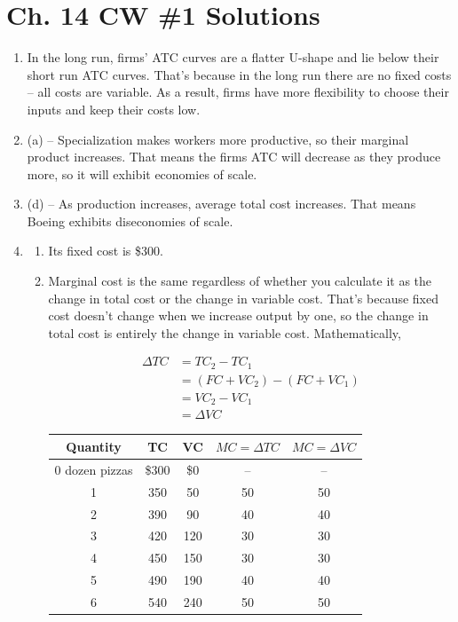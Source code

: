 \documentclass{article}
\begin{document}
\section*{Ch. 14 CW \#1 Solutions}

\begin{enumerate}

\item In the long run, firms' ATC curves are a flatter U-shape and lie below their short run ATC curves. That's because in the long run there are no fixed costs -- all costs are variable. As a result, firms have more flexibility to choose their inputs and keep their costs low.

\item (a) -- Specialization makes workers more productive, so their marginal product increases. That means the firms ATC will decrease as they produce more, so it will exhibit economies of scale.

\item (d) -- As production increases, average total cost increases. That means Boeing exhibits diseconomies of scale. 

\item

	\begin{enumerate}
	
	\item Its fixed cost is \$300.
	
	\item Marginal cost is the same regardless of whether you calculate it as the change in total cost or the change in variable cost. That's because fixed cost doesn't change when we increase output by one, so the change in total cost is entirely the change in variable cost. Mathematically,
	
	\begin{align*}
	\Delta TC &= TC_2 - TC_1 \\
	&= (FC + VC_2) - (FC + VC_1) \\
	&= VC_2 - VC_1 \\
	&= \Delta VC
	\end{align*}
	
	\begin{center}
	\begin{tabular}{c | c | c | c | c}
	Quantity & TC & VC & $MC = \Delta TC$ & $MC = \Delta VC$ \\
	\hline
	0 dozen pizzas & \$300 & \$0 & -- & -- \\
	1 & 350 & 50  & 50 & 50 \\
	2 & 390 & 90 & 40 & 40 \\
	3 & 420 & 120 & 30 & 30 \\
	4 & 450 & 150 & 30 & 30 \\
	5 & 490 & 190 & 40 & 40 \\
	6 & 540 & 240 & 50 & 50 \\
	\end{tabular}
	\end{center}
	

\end{enumerate}
\end{enumerate}
\end{document}
